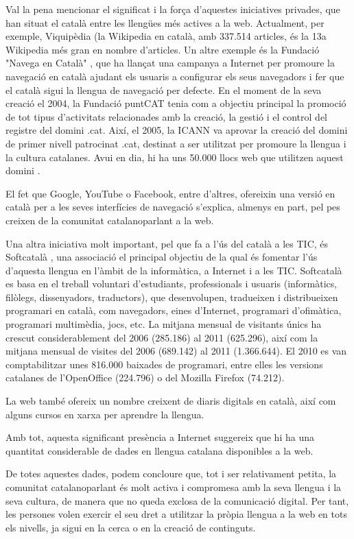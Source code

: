\begin{multicols}{2}
Val la pena mencionar el significat i la força d’aquestes iniciatives privades, que han situat el català entre les llengües més actives a la web. Actualment, per exemple, Viquipèdia (la Wikipedia en català, amb 337.514 articles, és la 13a Wikipedia més gran en nombre d’articles. Un altre exemple és la Fundació "Navega en Català" \cite{CAT-Nota19}, que ha llançat una campanya a Internet per promoure la navegació en català ajudant els usuaris a configurar els seus navegadors i fer que el català sigui la llengua de navegació per defecte. En el moment de la seva creació el 2004, la Fundació puntCAT tenia com a objectiu principal la promoció de tot tipus d’activitats relacionades amb la creació, la gestió i el control del registre del domini .cat. Així, el 2005, la ICANN va aprovar la creació del domini de primer nivell patrocinat .cat, destinat a ser utilitzat per promoure la llengua i la cultura catalanes. Avui en dia, hi ha uns 50.000 llocs web que utilitzen aquest domini \cite{CAT-Nota20}.

El fet que Google, YouTube o Facebook, entre d’altres, ofereixin una versió en català per a les seves interfícies de navegació s’explica, almenys en part, pel pes creixen de la comunitat catalanoparlant a la web.

Una altra iniciativa molt important, pel que fa a l’ús del català a les TIC, és Softcatalà \cite{CAT-Nota21}, una associació el principal objectiu de la qual és fomentar l’ús d’aquesta llengua en l’àmbit de la informàtica, a Internet i a les TIC. Softcatalà es basa en el treball voluntari d’estudiants, professionals i usuaris (informàtics, filòlegs, dissenyadors, traductors), que desenvolupen, tradueixen i distribueixen programari en català, com navegadors, eines d’Internet, programari d’ofimàtica, programari multimèdia, jocs, etc. La mitjana mensual de visitants únics ha crescut considerablement del 2006 (285.186) al 2011 (625.296), així com la mitjana mensual de visites del 2006  (689.142) al 2011 (1.366.644). El 2010 es van comptabilitzar unes 816.000 baixades de programari, entre elles les versions catalanes de l’OpenOffice (224.796) o del Mozilla Firefox (74.212).

La web també ofereix un nombre creixent de diaris digitals en català, així com alguns cursos en xarxa per aprendre la llengua.

Amb tot, aquesta significant presència a Internet suggereix que hi ha una quantitat considerable de dades en llengua catalana disponibles a la web.  

De totes aquestes dades, podem concloure que, tot i ser relativament petita, la comunitat catalanoparlant és molt activa i compromesa amb la seva llengua i la seva cultura, de manera que no queda exclosa de la comunicació digital. Per tant, les persones volen exercir el seu dret a utilitzar la pròpia llengua a la web en tots els nivells, ja sigui en la cerca o en la creació de continguts. 

\end{multicols}

